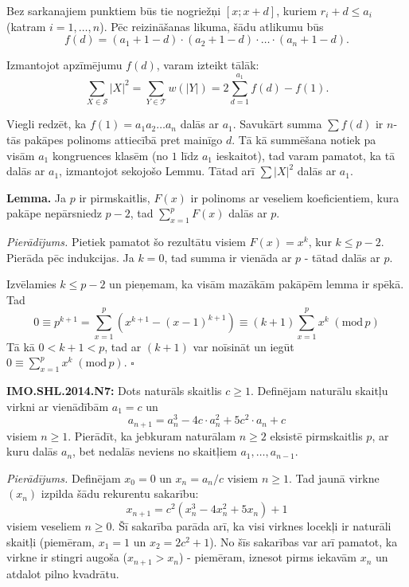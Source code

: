 \documentclass[11pt]{article}
\newenvironment{uzdevums}[1][\unskip]{%
\vspace{3mm}
\noindent
\textbf{#1:}
\noindent}
{}
\begin{document}
Bez sarkanajiem punktiem būs tie nogriežņi $[x;x+d]$, kuriem $r_i + d \leq a_i$ (katram $i=1,\ldots,n$). 
Pēc reizināšanas likuma, šādu atlikumu būs 
$$f(d) = (a_1 + 1 - d)\cdot(a_2 + 1 - d)\cdot \ldots \cdot (a_n + 1-d).$$

Izmantojot apzīmējumu $f(d)$, varam izteikt tālāk:
$$\sum_{X \in \mathcal{S}} |X|^2 = \sum_{Y \in \mathcal{T}} w(|Y|) = 
2\sum_{d=1}^{a_1} f(d) - f(1).$$

Viegli redzēt, ka $f(1)=a_1a_2\ldots{}a_n$ dalās ar $a_1$.
Savukārt summa $\sum f(d)$ ir $n$-tās pakāpes polinoms attiecībā pret mainīgo $d$. 
Tā kā summēšana notiek pa visām $a_1$ kongruences klasēm 
(no $1$ līdz $a_1$ ieskaitot), tad varam pamatot, ka tā dalās ar $a_1$, 
izmantojot sekojošo Lemmu. Tātad arī $\sum |X|^2$ dalās ar $a_1$. 


{\bf Lemma.} Ja $p$ ir pirmskaitlis, $F(x)$ ir polinoms ar veseliem koeficientiem, 
kura pakāpe nepārsniedz $p-2$, tad $\sum_{x=1}^p F(x)$ dalās ar $p$. 

{\em Pierādījums.} Pietiek pamatot šo rezultātu visiem $F(x)=x^k$, kur 
$k \leq p-2$. Pierāda pēc indukcijas. Ja $k=0$, tad summa ir vienāda 
ar $p$ - tātad dalās ar $p$.

Izvēlamies $k \leq p-2$ un pieņemam, ka visām mazākām pakāpēm lemma ir spēkā. 
Tad
$$0 \equiv p^{k+1} = \sum_{x=1}^p \left( x^{k+1} - (x-1)^{k+1} \right) \equiv 
(k+1)\sum_{x=1}^p x^k\;(\mbox{mod}\,p)$$
Tā kā $0 < k+1 < p$, tad ar $(k+1)$ var noīsināt un iegūt 
$0 \equiv \sum_{x=1}^p x^k\;(\mbox{mod}\,p)$. $\square$









\newpage


\begin{uzdevums}[IMO.SHL.2014.N7]
Dots naturāls skaitlis $c \ge 1$. Definējam naturālu skaitļu 
virkni ar vienādībām $a_1 = c$ un
$$a_{n+1}=a_n^3-4c\cdot a_n^2+5c^2\cdot a_n+c$$ 
visiem $n \geq 1$. 
Pierādīt, ka jebkuram naturālam $n \geq 2$ eksistē
pirmskaitlis $p$, ar kuru dalās $a_n$, bet nedalās 
neviens no skaitļiem $a_1,\ldots,a_{n-1}$.
\end{uzdevums}

\vspace{10pt}
{\em Pierādījums.} Definējam $x_0 = 0$ un $x_n = a_n/c$ visiem 
$n \geq 1$. Tad jaunā virkne $(x_n)$ izpilda šādu rekurentu sakarību:
$$x_{n+1} = c^2\left( x_n^3 - 4x_n^2 + 5x_n \right) + 1$$
visiem veseliem $n \geq 0$. Šī sakarība parāda arī, ka visi 
virknes locekļi ir naturāli skaitļi 
(piemēram, $x_1 = 1$ un $x_2 = 2c^2 + 1$). No šīs sakarības var arī pamatot, 
ka virkne ir stingri augoša ($x_{n+1} > x_n$) - piemēram, 
iznesot pirms iekavām $x_n$ un atdalot pilno kvadrātu. 
\end{document}
